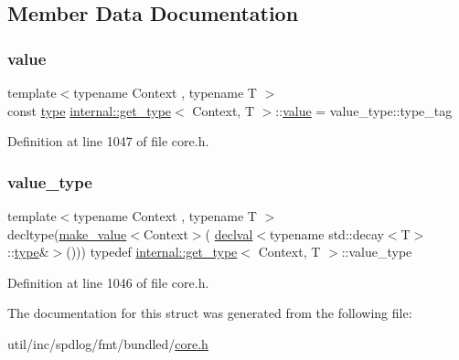 \subsection{Member Data Documentation}
\mbox{\label{structinternal_1_1get__type_ae806466c3a38f663a770869b8608749a}} 
\subsubsection{\texorpdfstring{value}{value}}
{\footnotesize\ttfamily template$<$typename Context , typename T $>$ \\
const \hyperlink{namespaceinternal_a8661864098ac0acff9a6dd7e66f59038}{type} \hyperlink{structinternal_1_1get__type}{internal\+::get\+\_\+type}$<$ Context, T $>$\+::\hyperlink{classinternal_1_1value}{value} = value\+\_\+type\+::type\+\_\+tag\hspace{0.3cm}{\ttfamily [static]}}



Definition at line 1047 of file core.\+h.

\mbox{\label{structinternal_1_1get__type_a3ad8a0402931621b6c86815d463c4b3f}} 
\subsubsection{\texorpdfstring{value\+\_\+type}{value\_type}}
{\footnotesize\ttfamily template$<$typename Context , typename T $>$ \\
decltype(\hyperlink{namespaceinternal_a8db45bc77a419c9cb588d3418671c6fd}{make\+\_\+value}$<$Context$>$( \hyperlink{namespaceinternal_a5f61aadb1d6afc8b79ef7ea57c39eafc}{declval}$<$typename std\+::decay$<$T$>$\+::\hyperlink{namespaceinternal_a8661864098ac0acff9a6dd7e66f59038}{type}\&$>$())) typedef \hyperlink{structinternal_1_1get__type}{internal\+::get\+\_\+type}$<$ Context, T $>$\+::value\+\_\+type}



Definition at line 1046 of file core.\+h.



The documentation for this struct was generated from the following file\+:\begin{DoxyCompactItemize}
\item 
util/inc/spdlog/fmt/bundled/\hyperlink{core_8h}{core.\+h}\end{DoxyCompactItemize}
